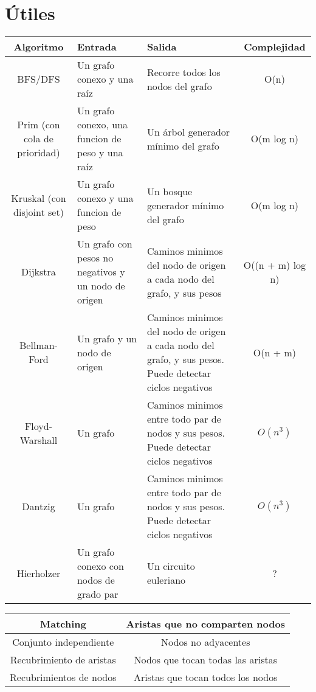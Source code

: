 \section{Útiles}

\begin{table}[h]
	\begin{center}
	    \begin{tabularx}{\textwidth}{|c|>{\raggedright\arraybackslash}X|>{\raggedright\arraybackslash}X|c|}
			\hline
			\textbf{Algoritmo} & \textbf{Entrada} & \textbf{Salida} & \textbf{Complejidad}\\
			\hline
			BFS/DFS & Un grafo conexo y una raíz & Recorre todos los nodos del grafo & O(n) \\
			\hline
			Prim (con cola de prioridad) & Un grafo conexo, una funcion de peso y una raíz & Un árbol generador mínimo del grafo & O(m log n) \\
			\hline
			Kruskal (con disjoint set) & Un grafo conexo y una funcion de peso & Un bosque generador mínimo del grafo & O(m log n) \\
			\hline
			Dijkstra & Un grafo con pesos no negativos y un nodo de origen & Caminos minimos del nodo de origen a cada nodo del grafo, y sus pesos & O((n + m) log n) \\
			\hline
			Bellman-Ford & Un grafo y un nodo de origen & Caminos minimos del nodo de origen a cada nodo del grafo, y sus pesos. Puede detectar ciclos negativos & O(n + m) \\
			\hline
			Floyd-Warshall & Un grafo & Caminos minimos entre todo par de nodos y sus pesos. Puede detectar ciclos negativos & $O(n^3)$ \\
			\hline
			Dantzig & Un grafo & Caminos minimos entre todo par de nodos y sus pesos. Puede detectar ciclos negativos & $O(n^3)$ \\
			\hline
			Hierholzer & Un grafo conexo con nodos de grado par & Un circuito euleriano & ? \\
			\hline
	    \end{tabularx}
  	\end{center}
\end{table}

\begin{table}[h]
	\begin{center}
    	\begin{tabular}{|c|c|}
    		\hline
    		Matching & Aristas que no comparten nodos \\
    		\hline
    		Conjunto independiente & Nodos no adyacentes \\
    		\hline
    		Recubrimiento de aristas & Nodos que tocan todas las aristas \\
    		\hline
    		Recubrimientos de nodos & Aristas que tocan todos los nodos \\
    		\hline
    	\end{tabular}
    \end{center}
\end{table}